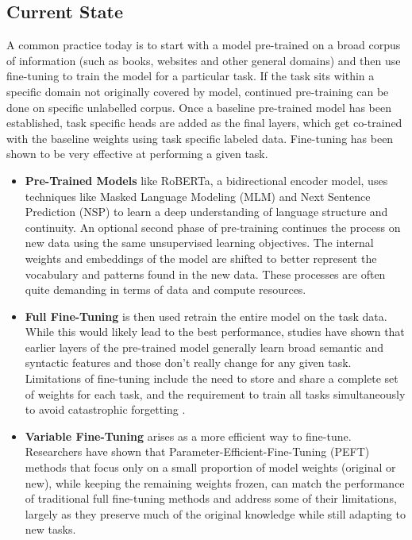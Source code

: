 \documentclass[draft,10pt,twocolumn,letterpaper]{article}
\begin{document}
\subsection{Current State} A common practice today is to start with a model pre-trained on a broad corpus of information (such as books, websites and other general domains) and then use fine-tuning to train the model for a particular task. If the task sits within a specific domain not originally covered by model, continued  pre-training can be done on specific unlabelled corpus. Once a baseline pre-trained model has been established, task specific heads are added as the final layers, which get co-trained with the baseline weights using task specific labeled data. Fine-tuning has been shown to be very effective at performing a given task.
\begin{itemize}
\item \textbf{Pre-Trained Models} like RoBERTa, a bidirectional encoder model, uses techniques like Masked Language Modeling (MLM) and Next Sentence Prediction (NSP) to learn a deep understanding of language structure and continuity. An optional second phase of pre-training \cite{gururangan2020dont} continues the process on new data using the same unsupervised learning objectives. The internal weights and embeddings of the model are shifted to better represent the vocabulary and patterns found in the new data. These processes are often quite demanding in terms of data and compute resources.

\item \textbf{Full Fine-Tuning} is then used retrain the entire model on the task data. While this would likely lead to the best performance, studies have shown that earlier layers of the pre-trained model generally learn broad semantic and syntactic features and those don’t really change for any given task. Limitations of fine-tuning include the need to store and share a complete set of weights for each task, and the requirement to train all tasks simultaneously to avoid catastrophic forgetting \cite{mccloskey1989catastrophic}.

\item \textbf{Variable Fine-Tuning} arises as a more efficient way to fine-tune. Researchers have shown that Parameter-Efficient-Fine-Tuning (PEFT) methods that focus only on a small proportion of model weights (original or new), while keeping the remaining weights frozen, can match the performance of traditional full fine-tuning methods \cite{houlsby2019parameter} and address some of their limitations, largely as they preserve much of the original knowledge while still adapting to new tasks. 

\end{itemize}
\end{document}

